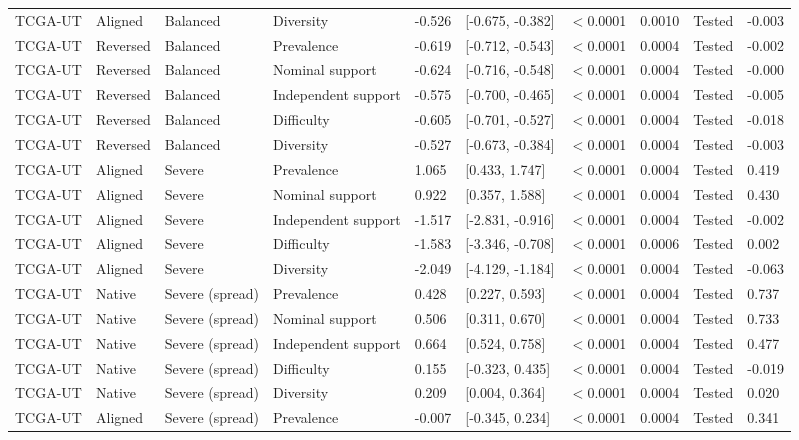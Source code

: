 \begin{longtable}{llllllllll}
TCGA-UT & Aligned & Balanced & Diversity & -0.526 & [-0.675, -0.382] & $<$0.0001 & 0.0010 & Tested & -0.003 \\
TCGA-UT & Reversed & Balanced & Prevalence & -0.619 & [-0.712, -0.543] & $<$0.0001 & 0.0004 & Tested & -0.002 \\
TCGA-UT & Reversed & Balanced & Nominal support & -0.624 & [-0.716, -0.548] & $<$0.0001 & 0.0004 & Tested & -0.000 \\
TCGA-UT & Reversed & Balanced & Independent support & -0.575 & [-0.700, -0.465] & $<$0.0001 & 0.0004 & Tested & -0.005 \\
TCGA-UT & Reversed & Balanced & Difficulty & -0.605 & [-0.701, -0.527] & $<$0.0001 & 0.0004 & Tested & -0.018 \\
TCGA-UT & Reversed & Balanced & Diversity & -0.527 & [-0.673, -0.384] & $<$0.0001 & 0.0004 & Tested & -0.003 \\
TCGA-UT & Aligned & Severe & Prevalence & 1.065 & [0.433, 1.747] & $<$0.0001 & 0.0004 & Tested & 0.419 \\
TCGA-UT & Aligned & Severe & Nominal support & 0.922 & [0.357, 1.588] & $<$0.0001 & 0.0004 & Tested & 0.430 \\
TCGA-UT & Aligned & Severe & Independent support & -1.517 & [-2.831, -0.916] & $<$0.0001 & 0.0004 & Tested & -0.002 \\
TCGA-UT & Aligned & Severe & Difficulty & -1.583 & [-3.346, -0.708] & $<$0.0001 & 0.0006 & Tested & 0.002 \\
TCGA-UT & Aligned & Severe & Diversity & -2.049 & [-4.129, -1.184] & $<$0.0001 & 0.0004 & Tested & -0.063 \\
TCGA-UT & Native & Severe (spread) & Prevalence & 0.428 & [0.227, 0.593] & $<$0.0001 & 0.0004 & Tested & 0.737 \\
TCGA-UT & Native & Severe (spread) & Nominal support & 0.506 & [0.311, 0.670] & $<$0.0001 & 0.0004 & Tested & 0.733 \\
TCGA-UT & Native & Severe (spread) & Independent support & 0.664 & [0.524, 0.758] & $<$0.0001 & 0.0004 & Tested & 0.477 \\
TCGA-UT & Native & Severe (spread) & Difficulty & 0.155 & [-0.323, 0.435] & $<$0.0001 & 0.0004 & Tested & -0.019 \\
TCGA-UT & Native & Severe (spread) & Diversity & 0.209 & [0.004, 0.364] & $<$0.0001 & 0.0004 & Tested & 0.020 \\
TCGA-UT & Aligned & Severe (spread) & Prevalence & -0.007 & [-0.345, 0.234] & $<$0.0001 & 0.0004 & Tested & 0.341 \\

\end{longtable}
